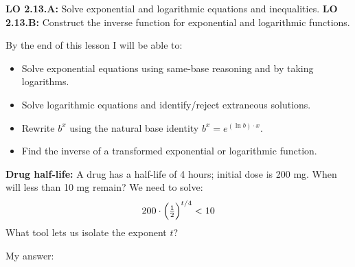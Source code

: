 \documentclass[10pt]{article}
\begin{document}
\namedateperiod

\vspace{0.08in}

\begin{objectivebox}
\textbf{LO 2.13.A:} Solve exponential and logarithmic equations and inequalities. \quad
\textbf{LO 2.13.B:} Construct the inverse function for exponential and logarithmic functions.

By the end of this lesson I will be able to:
\begin{itemize}[leftmargin=1.5em,itemsep=3pt,topsep=3pt]
  \item Solve exponential equations using same-base reasoning and by taking logarithms.
  \item Solve logarithmic equations and identify/reject extraneous solutions.
  \item Rewrite $b^x$ using the natural base identity $b^x = e^{(\ln b)\cdot x}$.
  \item Find the inverse of a transformed exponential or logarithmic function.
\end{itemize}
\end{objectivebox}

\vspace{0.06in}

\begin{vocabbox}
\end{vocabbox}

\vspace{0.06in}

\begin{hookbox}
\textbf{Drug half-life:} A drug has a half-life of 4 hours; initial dose is 200 mg.
When will less than 10 mg remain? We need to solve:
\[
  200\cdot\Bigl(\tfrac{1}{2}\Bigr)^{t/4} < 10
\]
What tool lets us isolate the exponent $t$?

\vspace{4pt}
My answer: 
\end{hookbox}

\vspace{0.06in}
\end{document}
